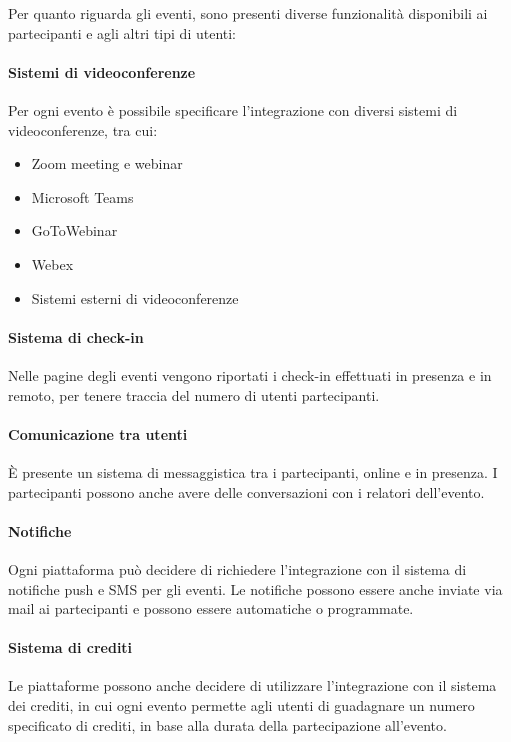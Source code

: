 \noindent Per quanto riguarda gli eventi, sono presenti diverse funzionalità disponibili ai partecipanti e agli altri tipi di utenti:
\paragraph{Sistemi di videoconferenze} Per ogni evento è possibile specificare l'integrazione con diversi sistemi di videoconferenze, tra cui:
\begin{itemize}
	\item Zoom meeting e webinar
	\item Microsoft Teams
	\item GoToWebinar
	\item Webex
	\item Sistemi esterni di videoconferenze
\end{itemize}
\paragraph{Sistema di check-in} Nelle pagine degli eventi vengono riportati i check-in effettuati in presenza e in remoto, per tenere traccia del numero di utenti partecipanti.
\paragraph{Comunicazione tra utenti} È presente un sistema di messaggistica tra i partecipanti, online e in presenza. I partecipanti possono anche avere delle conversazioni con i relatori dell'evento.
\paragraph{Notifiche} Ogni piattaforma può decidere di richiedere l'integrazione con il sistema di notifiche push e SMS per gli eventi. Le notifiche possono essere anche inviate via mail ai partecipanti e possono essere automatiche o programmate.
\paragraph{Sistema di crediti} Le piattaforme possono anche decidere di utilizzare l'integrazione con il sistema dei crediti, in cui ogni evento permette agli utenti di guadagnare un numero specificato di crediti, in base alla durata della partecipazione all'evento.

